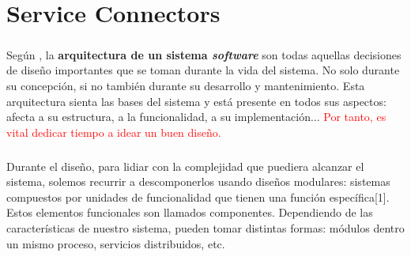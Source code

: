 \chapter{Service Connectors}

\paragraph{} Según \cite{SoftwareArchitectureFoundations}, la {\bf arquitectura de un sistema \textit{software}} son todas aquellas decisiones de diseño importantes que se toman durante la vida del sistema. No solo durante su concepción, si no también durante su desarrollo y mantenimiento. Esta arquitectura sienta las bases del sistema y está presente en todos sus aspectos: afecta a su estructura, a la funcionalidad, a su implementación... \textcolor{red}{Por tanto, es vital dedicar tiempo a idear un buen diseño.} 

\paragraph{} Durante el diseño, para lidiar con la complejidad que puediera alcanzar el sistema, solemos recurrir a descomponerlos usando diseños modulares: sistemas compuestos por unidades de funcionalidad que tienen una función específica[1]. Estos elementos funcionales son llamados componentes. Dependiendo de las características de nuestro sistema, pueden tomar distintas formas: módulos dentro un mismo proceso, servicios distribuidos, etc. 
